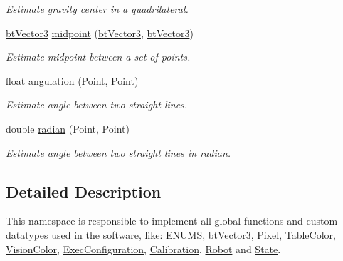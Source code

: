 \begin{DoxyCompactItemize}
\begin{DoxyCompactList}\small\item\em Estimate gravity center in a quadrilateral. \end{DoxyCompactList}\item 
\hyperlink{structcommon_1_1btVector3}{bt\+Vector3} \hyperlink{namespacecommon_a8018da38b6ea9b1dfa514730ad24ab2b}{midpoint} (\hyperlink{structcommon_1_1btVector3}{bt\+Vector3}, \hyperlink{structcommon_1_1btVector3}{bt\+Vector3})\hypertarget{namespacecommon_a8018da38b6ea9b1dfa514730ad24ab2b}{}\label{namespacecommon_a8018da38b6ea9b1dfa514730ad24ab2b}

\begin{DoxyCompactList}\small\item\em Estimate midpoint between a set of points. \end{DoxyCompactList}\item 
float \hyperlink{namespacecommon_a8c1ef8d4ce3fdb3e30af47c9c11bf04a}{angulation} (Point, Point)
\begin{DoxyCompactList}\small\item\em Estimate angle between two straight lines. \end{DoxyCompactList}\item 
double \hyperlink{namespacecommon_ac58a1918510dc4dbc7b65255593df38e}{radian} (Point, Point)\hypertarget{namespacecommon_ac58a1918510dc4dbc7b65255593df38e}{}\label{namespacecommon_ac58a1918510dc4dbc7b65255593df38e}

\begin{DoxyCompactList}\small\item\em Estimate angle between two straight lines in radian. \end{DoxyCompactList}\end{DoxyCompactItemize}


\subsection{Detailed Description}
This namespace is responsible to implement all global functions and custom datatypes used in the software, like\+: E\+N\+U\+MS, \hyperlink{structcommon_1_1btVector3}{bt\+Vector3}, \hyperlink{structcommon_1_1Pixel}{Pixel}, \hyperlink{structcommon_1_1TableColor}{Table\+Color}, \hyperlink{structcommon_1_1VisionColor}{Vision\+Color}, \hyperlink{structcommon_1_1ExecConfiguration}{Exec\+Configuration}, \hyperlink{structcommon_1_1Calibration}{Calibration}, \hyperlink{structcommon_1_1Robot}{Robot} and \hyperlink{structcommon_1_1State}{State}. 

